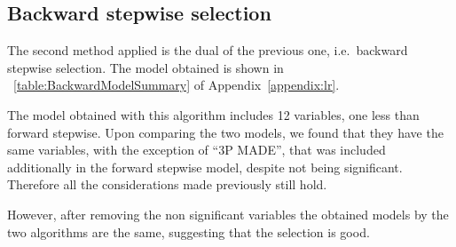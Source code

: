\subsection{Backward stepwise selection}

The second method applied is the dual of the previous one, i.e.\ backward stepwise selection. The model obtained is shown in \Tab~\ref{table:BackwardModelSummary} of Appendix~\ref{appendix:lr}.

The model obtained with this algorithm includes 12 variables, one less than forward stepwise. Upon comparing the two models, we found that they have the same variables, with the exception of ``3P MADE'', that was included additionally in the forward stepwise model, despite not being significant.
Therefore all the considerations made previously still hold.

However, after removing the non significant variables the obtained models by the two algorithms are the same, suggesting that the selection is good.